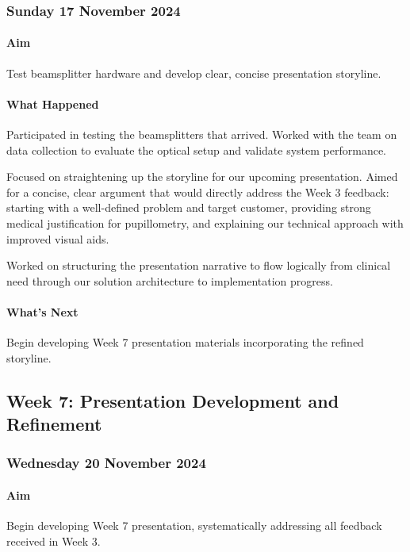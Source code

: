 \subsubsection*{Sunday 17 November 2024}

\paragraph{Aim}
Test beamsplitter hardware and develop clear, concise presentation storyline.

\paragraph{What Happened}
Participated in testing the beamsplitters that arrived. Worked with the team on data collection to evaluate the optical setup and validate system performance.

Focused on straightening up the storyline for our upcoming presentation. Aimed for a concise, clear argument that would directly address the Week 3 feedback: starting with a well-defined problem and target customer, providing strong medical justification for pupillometry, and explaining our technical approach with improved visual aids.

Worked on structuring the presentation narrative to flow logically from clinical need through our solution architecture to implementation progress.

\paragraph{What's Next}
Begin developing Week 7 presentation materials incorporating the refined storyline.

\subsection{Week 7: Presentation Development and Refinement}

\subsubsection*{Wednesday 20 November 2024}

\paragraph{Aim}
Begin developing Week 7 presentation, systematically addressing all feedback received in Week 3.

